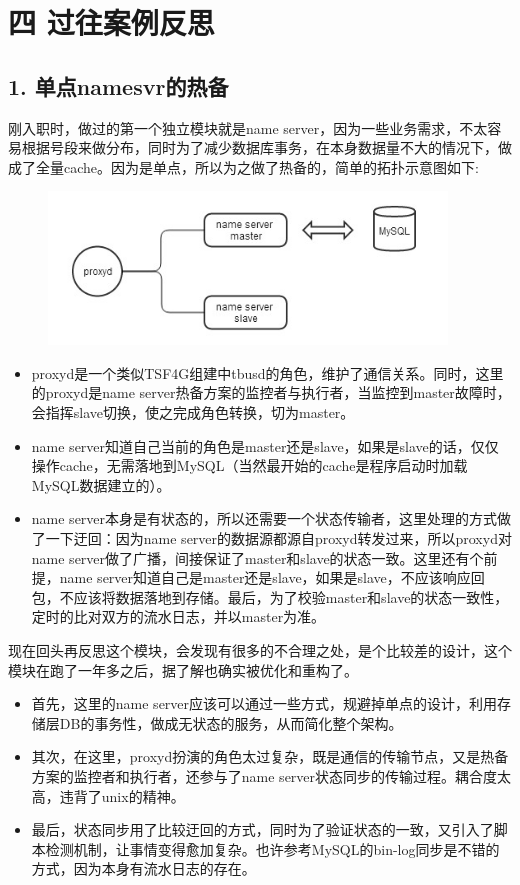\section* {\Large \ZHH 四 过往案例反思} {

    \subsection* {1. 单点namesvr的热备} {
        {刚入职时，做过的第一个独立模块就是name server，因为一些业务需求，不太容易根据号段来做分布，同时为了减少数据库事务，在本身数据量不大的情况下，做成了全量cache。因为是单点，所以为之做了热备的，简单的拓扑示意图如下:}
        \begin {figure}[htbp]
            \centering
            \includegraphics [width=300pt, keepaspectratio] {name_server.jpg}
        \end {figure}
        \begin {itemize}
            \item{proxyd是一个类似TSF4G组建中tbusd的角色，维护了通信关系。同时，这里的proxyd是name server热备方案的监控者与执行者，当监控到master故障时，会指挥slave切换，使之完成角色转换，切为master。}
            \item{name server知道自己当前的角色是master还是slave，如果是slave的话，仅仅操作cache，无需落地到MySQL（当然最开始的cache是程序启动时加载MySQL数据建立的）。}
            \item{name server本身是有状态的，所以还需要一个状态传输者，这里处理的方式做了一下迂回：因为name server的数据源都源自proxyd转发过来，所以proxyd对name server做了广播，间接保证了master和slave的状态一致。这里还有个前提，name server知道自己是master还是slave，如果是slave，不应该响应回包，不应该将数据落地到存储。最后，为了校验master和slave的状态一致性，定时的比对双方的流水日志，并以master为准。}
        \end {itemize}
        \par
        {现在回头再反思这个模块，会发现有很多的不合理之处，是个比较差的设计，这个模块在跑了一年多之后，据了解也确实被优化和重构了。}\par
        \begin{itemize}
            \item{首先，这里的name server应该可以通过一些方式，规避掉单点的设计，利用存储层DB的事务性，做成无状态的服务，从而简化整个架构。}
            \item{其次，在这里，proxyd扮演的角色太过复杂，既是通信的传输节点，又是热备方案的监控者和执行者，还参与了name server状态同步的传输过程。耦合度太高，违背了unix的精神。}
            \item{最后，状态同步用了比较迂回的方式，同时为了验证状态的一致，又引入了脚本检测机制，让事情变得愈加复杂。也许参考MySQL的bin-log同步是不错的方式，因为本身有流水日志的存在。}
        \end{itemize}
    }

}
